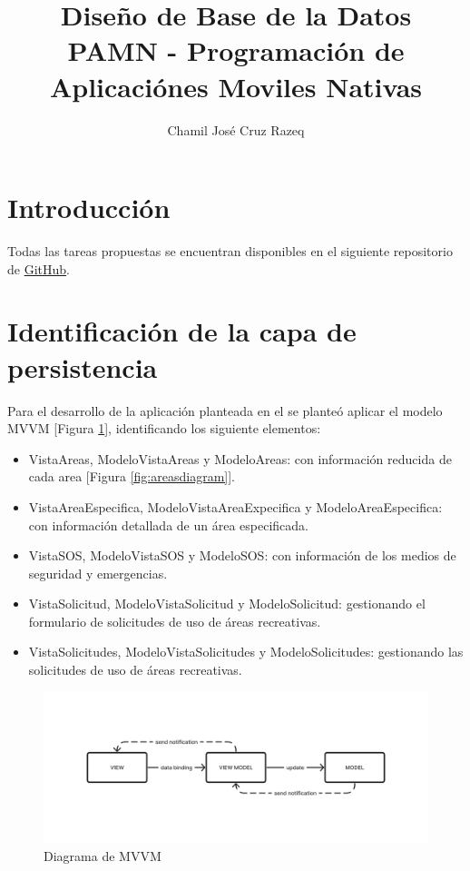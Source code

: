 \documentclass{article}
\title{Diseño de Base de la Datos \\[3ex] \small PAMN - Programación de Aplicaciónes Moviles Nativas}
\author{Chamil José Cruz Razeq}
\begin{document}
    \maketitle
    \thispagestyle{empty}
    \newpage

    \section{Introducción}
        Todas las tareas propuestas se encuentran disponibles en el siguiente
         repositorio de \href{https://github.com/chamilstudy/ulpgc_pamn_assigments}{GitHub}.

    \section{Identificación de la capa de persistencia}
    Para el desarrollo de la aplicación planteada en el \cite[Lab 3]{lab3} se planteó aplicar
     el modelo MVVM [Figura \ref{fig:mvvmdiagram}], identificando los siguiente elementos:
    
    \begin{itemize}
        \item VistaAreas, ModeloVistaAreas y ModeloAreas: con información reducida
               de cada area [Figura \ref{fig:areasdiagram}].
        \item VistaAreaEspecifica, ModeloVistaAreaExpecifica y ModeloAreaEspecifica:
               con información detallada de un área especificada.
        \item VistaSOS, ModeloVistaSOS y ModeloSOS: con información de los medios de
               seguridad y emergencias.
        \item VistaSolicitud, ModeloVistaSolicitud y ModeloSolicitud: gestionando el
               formulario de solicitudes de uso de áreas recreativas.
        \item VistaSolicitudes, ModeloVistaSolicitudes y ModeloSolicitudes: gestionando
               las solicitudes de uso de áreas recreativas.
    \end{itemize}

    \begin{figure}[H]
        \centerline{\includegraphics[scale=0.4]{mvvmdiagram}}
        \caption{Diagrama de MVVM}
        \label{fig:mvvmdiagram}
    \end{figure}
\end{document}
